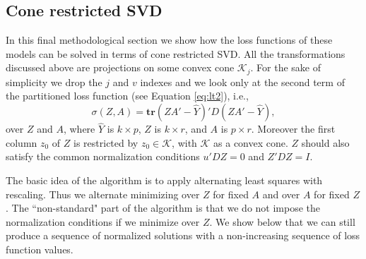 \documentclass[article]{Z}
\begin{document}
\subsection{Cone restricted SVD}
In this final methodological section we show how the loss functions of these models can be solved in terms of cone restricted SVD. All the transformations discussed above are projections on some convex cone $\mathcal{K}_j$.  
For the sake of simplicity we drop the $j$ and $v$ indexes and we look only at the second term of the partitioned loss function (see Equation \ref{eq:lt2}), i.e., 
\begin{equation}
\sigma(Z,A)=\mathbf{tr}(ZA'-\hat Y)'D(ZA'- \hat Y),
\end{equation}
over $Z$ and $A$, where $\hat Y$ is $k\times p$, $Z$ is $k\times r$, and $A$ is $p\times r$. Moreover
the first column $z_0$ of $Z$ is restricted by $z_0\in\mathcal{K}$, with $\mathcal{K}$
as a convex cone. $Z$ should also satisfy the common normalization conditions $u'DZ=0$ and $Z'DZ=I$.

The basic idea of the algorithm is to apply alternating least squares with rescaling.
Thus we alternate minimizing over $Z$ for fixed $A$ and over $A$ for fixed $Z$.
The ``non-standard" part of the algorithm is that we do not impose the normalization
conditions if we minimize over $Z$. We show below that we can still produce a
sequence of normalized solutions with a non-increasing sequence of loss function
values.
\end{document}
